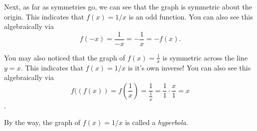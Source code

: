 \documentclass{ximera}
\begin{document}
Next, as far as symmetries go, we can see that the graph is symmetric about the origin.  This indicates that $f(x) = 1/x$ is an odd function.  You can also see this algebraically via $$  f(-x) = \frac{1}{-x} = -\frac{1}{x} = -f(x).  $$

You may also noticed that the graph of $f(x)=\frac{1}{x}$ is symmetric across the line $y=x$.  This indicates that $f(x) = 1/x$ is it's own inverse!  You can also see this algebraically via $$  f((f(x)) = f\left(\frac{1}{x}\right) = \frac{1}{\frac{1}{x}} = \frac{1}{1} \cdot \frac{x}{1} = x  $$.


By the way, the graph of $f(x) = 1/x$ is called a \emph{hyperbola}.

%
%
%
%
%
%
\end{document}
